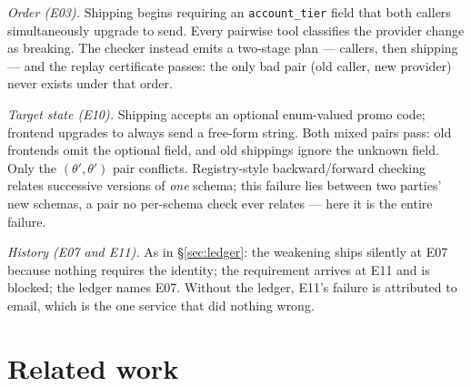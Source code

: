 \emph{Order (E03).} Shipping begins requiring an
\texttt{account\_tier} field that both callers simultaneously upgrade
to send. Every pairwise tool classifies the provider change as
breaking. The checker instead emits a two-stage plan --- callers, then
shipping --- and the replay certificate passes: the only bad pair (old
caller, new provider) never exists under that order.

\emph{Target state (E10).} Shipping accepts an optional
enum-valued promo code; frontend upgrades to always send a free-form
string. Both mixed pairs pass: old frontends omit the optional field,
and old shippings ignore the unknown field. Only the
$(\theta',\theta')$ pair conflicts. Registry-style
backward/forward checking relates successive versions of \emph{one}
schema; this failure lies between two parties' new schemas, a pair no
per-schema check ever relates --- here it is the entire failure.

\emph{History (E07 and E11).} As in \S\ref{sec:ledger}: the
weakening ships silently at E07 because nothing requires the
identity; the requirement arrives at E11 and is blocked; the
ledger names E07. Without the ledger, E11's failure is
attributed to email, which is the one service that did nothing wrong.

\section{Related work}
\label{sec:related}

